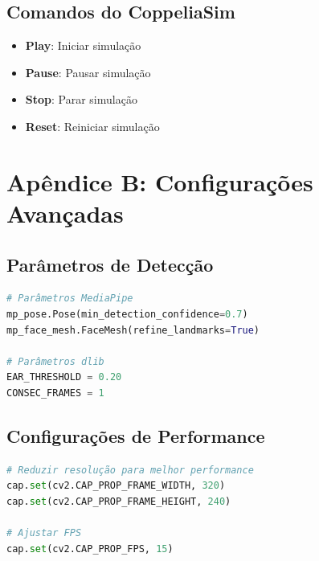 \documentclass[12pt,a4paper]{article}
\begin{document}
\subsection{Comandos do CoppeliaSim}

\begin{itemize}
    \item \textbf{Play}: Iniciar simulação
    \item \textbf{Pause}: Pausar simulação
    \item \textbf{Stop}: Parar simulação
    \item \textbf{Reset}: Reiniciar simulação
\end{itemize}

\section{Apêndice B: Configurações Avançadas}

\subsection{Parâmetros de Detecção}

\begin{lstlisting}[language=python]
# Parâmetros MediaPipe
mp_pose.Pose(min_detection_confidence=0.7)
mp_face_mesh.FaceMesh(refine_landmarks=True)

# Parâmetros dlib
EAR_THRESHOLD = 0.20
CONSEC_FRAMES = 1
\end{lstlisting}

\subsection{Configurações de Performance}

\begin{lstlisting}[language=python]
# Reduzir resolução para melhor performance
cap.set(cv2.CAP_PROP_FRAME_WIDTH, 320)
cap.set(cv2.CAP_PROP_FRAME_HEIGHT, 240)

# Ajustar FPS
cap.set(cv2.CAP_PROP_FPS, 15)
\end{lstlisting}
\end{document}
